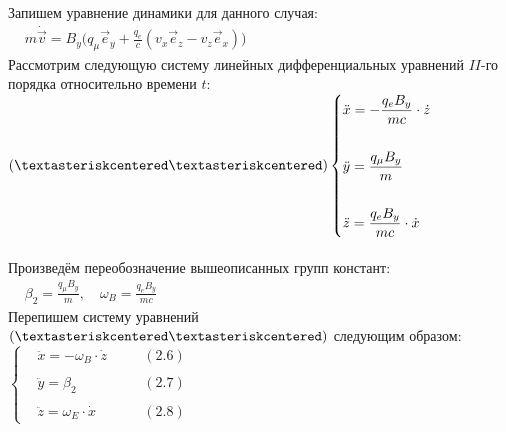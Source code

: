\documentclass[oneside,final,14pt]{extarticle}
\begin{document}
	\noindent Запишем уравнение динамики для данного случая: \\
	
	\begin{math}
		\begin{aligned}
			& m\dot{\vec{v}} = B_{y}\Big(q_{\mu}\vec{e}_{y} + \frac{q_{e}}{c}\left(v_{x}\vec{e}_{z} - v_{z}\vec{e}_{x}\right)\Big)
		\end{aligned}
	\end{math} \\
	
	\noindent Рассмотрим следующую систему линейных дифференциальных уравнений $II$-го порядка относительно времени $t$: \\
	
	\begin{math}
		(\textasteriskcentered\textasteriskcentered) \left\{
		\begin{aligned}
			& \ddot{x} = -\frac{q_{e}B_{y}}{mc} \cdot \dot{z} \\\\
			& \ddot{y} =  \frac{q_{\mu}B_{y}}{m} \\\\
			& \ddot{z} = \frac{q_{e}B_{y}}{mc} \cdot \dot{x}
		\end{aligned}
		\right.
	\end{math} \\\\

	\noindent Произведём переобозначение вышеописанных групп констант: \\
	
	\begin{math}
		\begin{aligned}
			& \beta_{2} = \frac{q_{\mu}B_{y}}{m}, \quad \omega_{B} = \frac{q_{e}B_{y}}{mc}
		\end{aligned}
	\end{math} \\
	
	\noindent Перепишем систему уравнений $(\textasteriskcentered\textasteriskcentered)$ следующим образом: \\
	
	\begin{math}
		\left\{
		\begin{aligned}
			& \ddot{x} = -\omega_{B} \cdot \dot{z} \quad && (2.6) \\\\
			& \ddot{y} = \beta_{2} \quad && (2.7) \\\\
			& \ddot{z} = \omega_{E} \cdot \dot{x} \quad && (2.8)
		\end{aligned}
		\right.
	\end{math} \\
	
\end{document}
